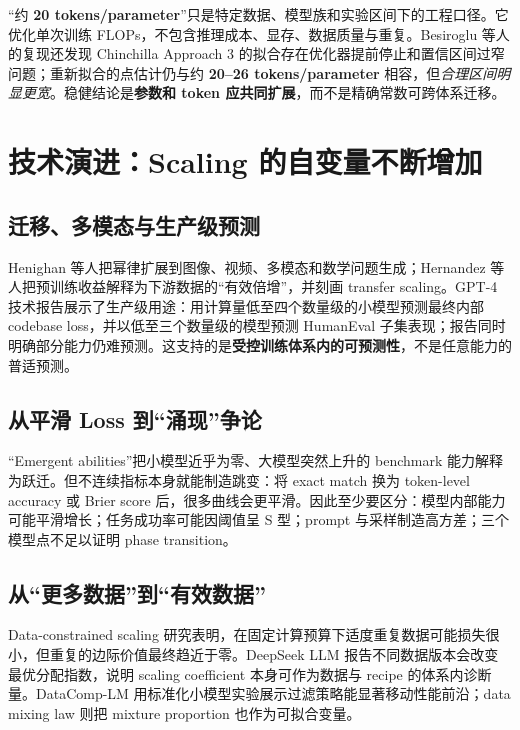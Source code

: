 \documentclass[UTF8,10pt,a4paper,fontset=none]{ctexart}
\newcommand{\term}[1]{\textbf{#1}}
\begin{document}
“约 \textbf{20 tokens/parameter}”只是特定数据、模型族和实验区间下的工程口径。它优化单次训练 FLOPs，不包含推理成本、显存、数据质量与重复。Besiroglu 等人的复现还发现 Chinchilla Approach 3 的拟合存在优化器提前停止和置信区间过窄问题；重新拟合的点估计仍与约 \textbf{20--26 tokens/parameter} 相容，但\textit{合理区间明显更宽}\cite{besiroglu2024}。稳健结论是\term{参数和 token 应共同扩展}，而不是精确常数可跨体系迁移。

\section{技术演进：Scaling 的自变量不断增加}

\subsection{迁移、多模态与生产级预测}

Henighan 等人把幂律扩展到图像、视频、多模态和数学问题生成\cite{henighan2020}；Hernandez 等人把预训练收益解释为下游数据的“有效倍增”，并刻画 transfer scaling\cite{hernandez2021}。GPT-4 技术报告展示了生产级用途：用计算量低至四个数量级的小模型预测最终内部 codebase loss，并以低至三个数量级的模型预测 HumanEval 子集表现；报告同时明确部分能力仍难预测\cite{openai2023gpt4}。这支持的是\term{受控训练体系内的可预测性}，不是任意能力的普适预测。

\subsection{从平滑 Loss 到“涌现”争论}

“Emergent abilities”把小模型近乎为零、大模型突然上升的 benchmark 能力解释为跃迁\cite{wei2022}。但不连续指标本身就能制造跳变：将 exact match 换为 token-level accuracy 或 Brier score 后，很多曲线会更平滑\cite{schaeffer2023}。因此至少要区分：模型内部能力可能平滑增长；任务成功率可能因阈值呈 S 型；prompt 与采样制造高方差；三个模型点不足以证明 phase transition。

\subsection{从“更多数据”到“有效数据”}

Data-constrained scaling 研究表明，在固定计算预算下适度重复数据可能损失很小，但重复的边际价值最终趋近于零\cite{muennighoff2023}。DeepSeek LLM 报告不同数据版本会改变最优分配指数，说明 scaling coefficient 本身可作为数据与 recipe 的体系内诊断量\cite{deepseekllm2024}。DataComp-LM 用标准化小模型实验展示过滤策略能显著移动性能前沿\cite{datacomplm2024}；data mixing law 则把 mixture proportion 也作为可拟合变量\cite{datamixing2024}。
\end{document}

